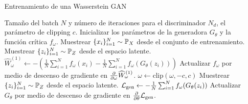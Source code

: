 {{    \begin{algorithm}[ht!]
        \caption{Entrenamiento de una Wasserstein GAN}\label{alg:WGAN}
        \begin{algorithmic}[1]
            \Require Tamaño del batch $N$ y número de iteraciones para el discriminador $N_d$, el parámetro de clipping $c$.
            \State Inicializar los parámetros de la generadora $G_\theta$ y la función crítica $f_\omega$.
            \State Muestrear $\{x_i\}_{i=1}^{N} \sim \Prob_X$ desde el conjunto de entrenamiento.
            \State Muestrear $\{z_i\}_{i=1}^{N} \sim \Prob_Z$ desde el espacio latente.
            \State $\widehat W_{\omega}^{(1)} \gets - \left( \frac{1}{N}\sum_{i=1}^{N} f_{\omega}(x_i) - \frac{1}{N}\sum_{i=1}^{N} f_{\omega}(G_{\theta}(z_i)) \right)$
            \State Actualizar $f_{\omega}$ por medio de descenso de gradiente en $\pdv{\omega} \widehat W_{\omega}^{(1)}$.
            \State $\omega \gets \text{clip}(\omega, -c, c)$
            \EndFor
            \State Muestrear $\{z_i\}_{i=1}^{N} \sim \Prob_Z$ desde el espacio latente.
            \State $\mathcal{L}_{\mathrm{gen}} \gets - \frac{1}{N}\sum_{i=1}^{N} f_\omega(G_\theta(z_i))$
            \State Actualizar $G_\theta$ por medio de descenso de gradiente en $\pdv{\theta} \mathcal{L}_{\mathrm{gen}}$.
            \EndWhile
        \end{algorithmic}
    \end{algorithm}

}  %
}  %